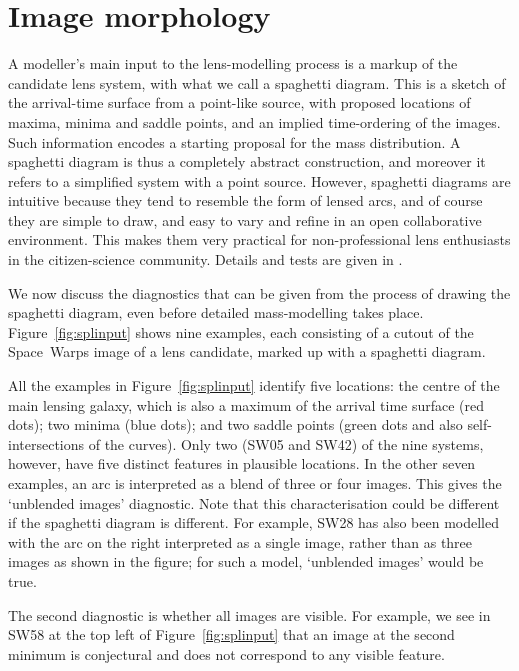 \section{Image morphology}\label{sec:morph}

A modeller's main input to the lens-modelling process is a markup of
the candidate lens system, with what we call a spaghetti diagram.
This is a sketch of the arrival-time surface from a point-like source,
with proposed locations of maxima, minima and saddle points, and an
implied time-ordering of the images.  Such information encodes a
starting proposal for the mass distribution.  A spaghetti diagram is
thus a completely abstract construction, and moreover it refers to a
simplified system with a point source.  However, spaghetti diagrams
are intuitive because they tend to resemble the form of lensed arcs,
and of course they are simple to draw, and easy to vary and refine in
an open collaborative environment.  This makes them very practical for
non-professional lens enthusiasts in the citizen-science community.
Details and tests are given in \cite{2015MNRAS.447.2170K}.

We now discuss the diagnostics that can be given from the process of
drawing the spaghetti diagram, even before detailed mass-modelling
takes place.  Figure~\ref{fig:splinput} shows nine examples, each
consisting of a cutout of the Space~Warps image of a lens candidate,
marked up with a spaghetti diagram.

All the examples in Figure~\ref{fig:splinput} identify five locations:
the centre of the main lensing galaxy, which is also a maximum of the
arrival time surface (red dots); two minima (blue dots); and two
saddle points (green dots and also self-intersections of the curves).
Only two (SW05 and SW42) of the nine systems, however, have five
distinct features in plausible locations.  In the other seven
examples, an arc is interpreted as a blend of three or four images.
This gives the `unblended images' diagnostic.  Note that this
characterisation could be different if the spaghetti diagram is
different.  For example, SW28 has also been modelled with the arc on
the right interpreted as a single image, rather than as three images
as shown in the figure; for such a model, `unblended images' would be
true.

The second diagnostic is whether all images are visible.  For example,
we see in SW58 at the top left of Figure~\ref{fig:splinput} that an
image at the second minimum is conjectural and does not correspond to
any visible feature.


